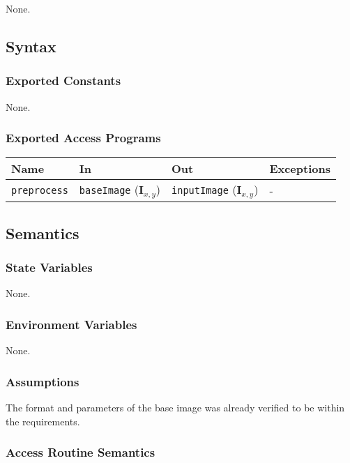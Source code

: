 \documentclass[12pt, titlepage]{article}
\def\code#1{\texttt{#1}}
\begin{document}
None.

\subsection{Syntax}

\subsubsection{Exported Constants}

None.

\subsubsection{Exported Access Programs}

\begin{center}
\begin{tabular}{p{2cm} p{4cm} p{4cm} p{2cm}}
\hline
\textbf{Name} & \textbf{In} & \textbf{Out} & \textbf{Exceptions} \\
\hline
\code{preprocess} & \code{baseImage} ($\mathbf{I}_{x,y}$) & \code{inputImage} ($\mathbf{I}_{x,y}$) & - \\
\hline
\end{tabular}
\end{center}

\subsection{Semantics}

\subsubsection{State Variables}

None.

\subsubsection{Environment Variables}

None.

\subsubsection{Assumptions}

The format and parameters of the base image was already verified to be within the requirements.

\subsubsection{Access Routine Semantics}
\end{document}
